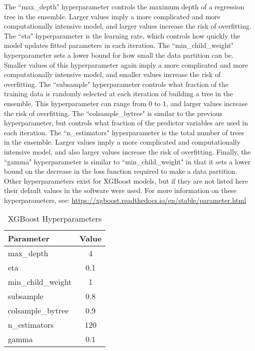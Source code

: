 The ``max\_depth" hyperparameter controls the maximum depth of a regression tree in the ensemble. Larger values imply a more complicated and more computationally intensive model, and larger values increase the risk of overfitting. The ``eta" hyperparameter is the learning rate, which controls how quickly the model updates fitted parameters in each iteration. The ``min\_child\_weight" hyperparameter sets a lower bound for how small the data partition can be. Smaller values of this hyperparameter again imply a more complicated and more computationally intensive model, and smaller values increase the risk of overfitting. The ``subsample" hyperparameter controls what fraction of the training data is randomly selected at each iteration of building a tree in the ensemble. This hyperparameter can range from 0 to 1, and larger values increase the risk of overfitting. The ``colsample\_bytree" is similar to the previous hyperparameter, but controls what fraction of the predictor variables are used in each iteration. The ``n\_estimators" hyperparameter is the total number of trees in the ensemble. Larger values imply a more complicated and computationally intensive model, and also larger values increase the risk of overfitting. Finally, the ``gamma" hyperparameter is similar to ``min\_child\_weight" in that it sets a lower bound on the decrease in the loss function required to make a data partition. Other hyperparameters exist for XGBoost models, but if they are not listed here their default values in the software were used. For more information on these hyperparameters, see: \url{https://xgboost.readthedocs.io/en/stable/parameter.html}

\begin{table}[ht]
\centering
\begin{tabular}{|l|c|}
\hline
\textbf{Parameter} & \textbf{Value} \\
\hline
max\_depth & 4 \\
eta & 0.1 \\
min\_child\_weight & 1 \\
subsample & 0.8 \\
colsample\_bytree & 0.9 \\
n\_estimators & 120 \\
gamma & 0.1 \\
\hline
\end{tabular}
\caption{XGBoost Hyperparameters}
\label{tab:xgb-params}
\end{table}

